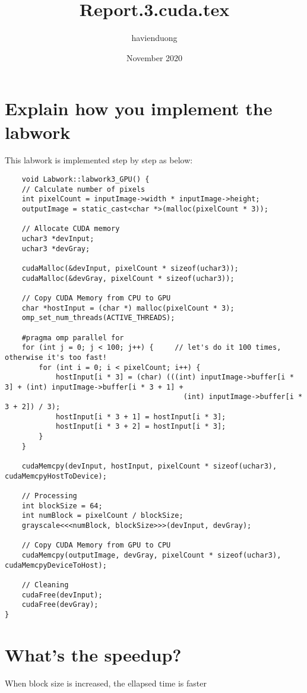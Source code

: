 \documentclass{article}
\title{Report.3.cuda.tex}
\author{havienduong }
\date{November 2020}
\begin{document}
\maketitle

\section{Explain how you implement the labwork}
This labwork is implemented step by step as below:
\begin{verbatim}
    void Labwork::labwork3_GPU() {
    // Calculate number of pixels
    int pixelCount = inputImage->width * inputImage->height;
    outputImage = static_cast<char *>(malloc(pixelCount * 3));

    // Allocate CUDA memory
    uchar3 *devInput;
    uchar3 *devGray;

    cudaMalloc(&devInput, pixelCount * sizeof(uchar3));
    cudaMalloc(&devGray, pixelCount * sizeof(uchar3));    

    // Copy CUDA Memory from CPU to GPU
    char *hostInput = (char *) malloc(pixelCount * 3);
    omp_set_num_threads(ACTIVE_THREADS);

    #pragma omp parallel for
    for (int j = 0; j < 100; j++) {     // let's do it 100 times, otherwise it's too fast!
        for (int i = 0; i < pixelCount; i++) {
            hostInput[i * 3] = (char) (((int) inputImage->buffer[i * 3] + (int) inputImage->buffer[i * 3 + 1] +
                                          (int) inputImage->buffer[i * 3 + 2]) / 3);
            hostInput[i * 3 + 1] = hostInput[i * 3];
            hostInput[i * 3 + 2] = hostInput[i * 3];
        }
    }

    cudaMemcpy(devInput, hostInput, pixelCount * sizeof(uchar3), cudaMemcpyHostToDevice);

    // Processing
    int blockSize = 64;
    int numBlock = pixelCount / blockSize;
    grayscale<<<numBlock, blockSize>>>(devInput, devGray);

    // Copy CUDA Memory from GPU to CPU
    cudaMemcpy(outputImage, devGray, pixelCount * sizeof(uchar3), cudaMemcpyDeviceToHost);

    // Cleaning
    cudaFree(devInput);
    cudaFree(devGray);
}
\end{verbatim}

\section{What’s the speedup?}
When block size is increased, the ellapsed time is faster
\end{document}
